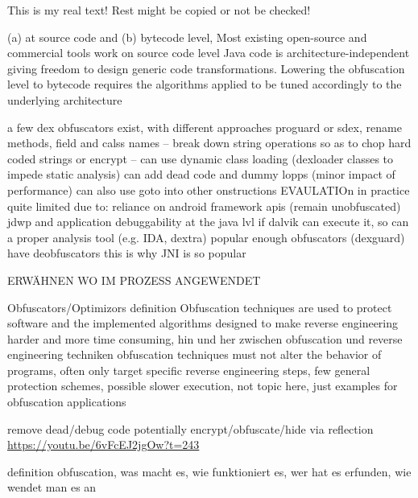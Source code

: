 This is my real text! Rest might be copied or not be checked!

%
(a) at source code and (b) bytecode level, Most existing open-source and commercial tools work on source code level\newline
Java code is architecture-independent giving freedom to design generic code transformations. Lowering the obfuscation level to bytecode requires the algorithms applied to be tuned accordingly to the underlying architecture\newline
\cite{kovachevaMaster}
%

%
a few dex obfuscators exist, with different approaches
proguard or sdex, rename methods, field and calss names -- break down string operations so as to chop hard coded strings or encrypt -- can use dynamic class loading (dexloader classes to impede static analysis)
can add dead code and dummy lopps (minor impact of performance)
can also use goto into other onstructions
EVAULATIOn
in practice quite limited due to:
reliance on android framework apis (remain unobfuscated)
jdwp and application debuggability at the java lvl
if dalvik can execute it, so can a proper analysis tool (e.g. IDA, dextra)
popular enough obfuscators (dexguard) have deobfuscators
this is why JNI is so popular

\cite{andevconDalvikART}
%


ERWÄHNEN WO IM PROZESS ANGEWENDET\newline


Obfuscators/Optimizors definition\newline
Obfuscation techniques are used to protect software and the implemented algorithms\newline
designed to make reverse engineering harder and more time consuming, hin und her zwischen obfuscation und reverse engineering techniken\newline
obfuscation techniques must not alter the behavior of programs, often only target specific reverse engineering steps, few general protection schemes, possible slower execution, not topic here, just examples for obfuscation applications

remove dead/debug code\newline
potentially encrypt/obfuscate/hide via reflection\newline
\url{https://youtu.be/6vFcEJ2jgOw?t=243}\newline

definition obfuscation, was macht es, wie funktioniert es, wer hat es erfunden, wie wendet man es an\newline

